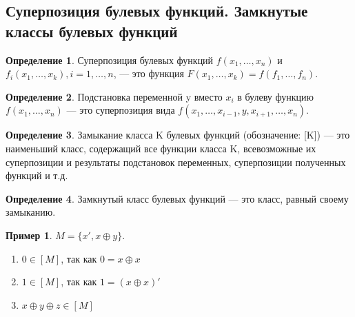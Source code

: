 \documentclass[a4paper]{article}
\theoremstyle{definition}
\newtheorem*{example}{Пример}
\newtheorem*{definition}{Определение}
\theoremstyle{remark}
\begin{document}
    \subsection{Суперпозиция булевых функций. Замкнутые классы булевых функций}
    \begin{definition}
        Суперпозиция булевых функций $f(x_1, \dots, x_n)$ и $f_i(x_1, \dots, x_k), i = 1, \dots, n$, — это функция 
        $F(x_1, \dots, x_k) = f(f_1, \dots, f_n).$
    \end{definition}
    \begin{definition}
        Подстановка переменной y вместо $x_i$ в булеву функцию $f(x_1, \dots, x_n)$ — это суперпозиция вида 
        $f(x_1, \dots,x_{i - 1}, y, x_{i + 1}, \dots, x_n).$
    \end{definition}
    \begin{definition}
        Замыкание класса K булевых функций (обозначение: [K]) — это наименьший класс, 
        содержащий все функции класса K, всевозможные их суперпозиции и результаты 
        подстановок переменных, суперпозиции полученных функций и т.д.
    \end{definition}
    \begin{definition}
        Замкнутый класс булевых функций — это класс, равный своему замыканию.
    \end{definition}
    \begin{example}
        $M = \{x', x\oplus y\}.$
        \begin{enumerate}
            \item $0\in [M]$, так как $0 = x\oplus x$
            \item $1\in [M]$, так как $1 = (x\oplus x)'$
            \item $x\oplus y\oplus z\in [M]$
        \end{enumerate}
    \end{example}
\end{document}
